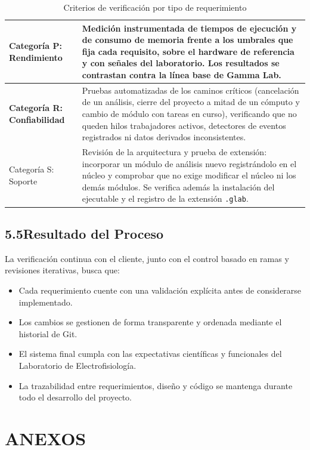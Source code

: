 \documentclass[12pt, letterpaper]{article}
\begin{document}
\begin{table}[H]
\begin{tabularx}{\textwidth}{|
>{\raggedright\arraybackslash\bfseries}p{5.1cm}|
X|
}
Categoría P: Rendimiento &
Medición instrumentada de tiempos de ejecución y de consumo de memoria frente a los
umbrales que fija cada requisito, sobre el hardware de referencia y con señales del
laboratorio. Los resultados se contrastan contra la línea base de Gamma Lab.
\\ \hline

\rowcolor{lightgray2}
Categoría R: Confiabilidad &
Pruebas automatizadas de los caminos críticos (cancelación de un análisis, cierre
del proyecto a mitad de un cómputo y cambio de módulo con tareas en curso),
verificando que no queden hilos trabajadores activos, detectores de eventos
registrados ni datos derivados inconsistentes.
\\ \hline

Categoría S: Soporte &
Revisión de la arquitectura y prueba de extensión: incorporar un módulo de análisis
nuevo registrándolo en el núcleo y comprobar que no exige modificar el núcleo ni los
demás módulos. Se verifica además la instalación del ejecutable y el registro de la
extensión \texttt{.glab}.
\\ \hline

\end{tabularx}

\caption{Criterios de verificación por tipo de requerimiento}
\label{tab:criterios_verificacion}

\end{table}

\subsection*{5.5\quad Resultado del Proceso}

La verificación continua con el cliente, junto con el control basado en ramas y revisiones
iterativas, busca que:

\begin{itemize}[leftmargin=1.5em,itemsep=3pt]
  \item Cada requerimiento cuente con una validación explícita antes de considerarse
        implementado.
  \item Los cambios se gestionen de forma transparente y ordenada mediante el historial
        de Git.
  \item El sistema final cumpla con las expectativas científicas y funcionales del
        Laboratorio de Electrofisiología.
  \item La trazabilidad entre requerimientos, diseño y código se mantenga durante todo
        el desarrollo del proyecto.
\end{itemize}

\newpage
\section{ANEXOS}
\end{document}
